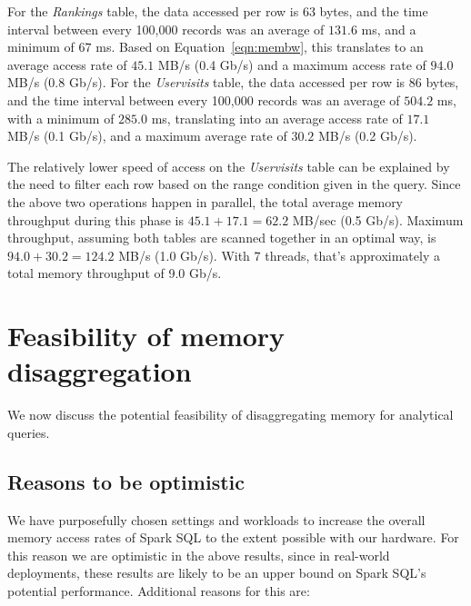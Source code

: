 \documentclass[9pt]{sig-alternate-05-2015}
\begin{document}
For the {\em Rankings} table, the data accessed per row is 63 bytes, and the
time interval between every 100,000 records was an average of
$131.6$ ms, and a minimum of $67$ ms.  Based on Equation~\ref{eqn:membw},
this translates to an average access rate of $45.1$ MB/s (0.4 Gb/s) and
a maximum access rate of $94.0$ MB/s (0.8 Gb/s).
For the {\em Uservisits} table, the data accessed per row is
86 bytes, and the time interval between every 100,000 records was
an average of $504.2$ ms, with a minimum of $285.0$ ms, translating
into an average access rate of $17.1$ MB/s (0.1 Gb/s),
and a maximum average rate of $30.2$ MB/s (0.2 Gb/s).

The relatively lower speed of access on the {\em Uservisits} table can be
explained by the need to filter each row based on the range condition given in
the query.  Since the above two operations happen in parallel, the total
average memory throughput during this phase is $45.1 + 17.1 = 62.2$ MB/sec
(0.5 Gb/s).  Maximum throughput, assuming both tables are scanned together in
an optimal way, is $94.0 + 30.2 = 124.2$ MB/s (1.0 Gb/s).  With 7 threads,
that's approximately a total memory throughput of 9.0 Gb/s.

\section{Feasibility of memory disaggregation}

We now discuss the potential feasibility of disaggregating memory
for analytical queries.

\subsection{Reasons to be optimistic}

We have purposefully chosen settings and workloads to increase the overall
memory access rates of Spark SQL to the extent possible with our hardware.  For
this reason we are optimistic in the above results, since in real-world
deployments, these results are likely to be an upper bound on Spark SQL's
potential performance.  Additional reasons for this are:
\end{document}

